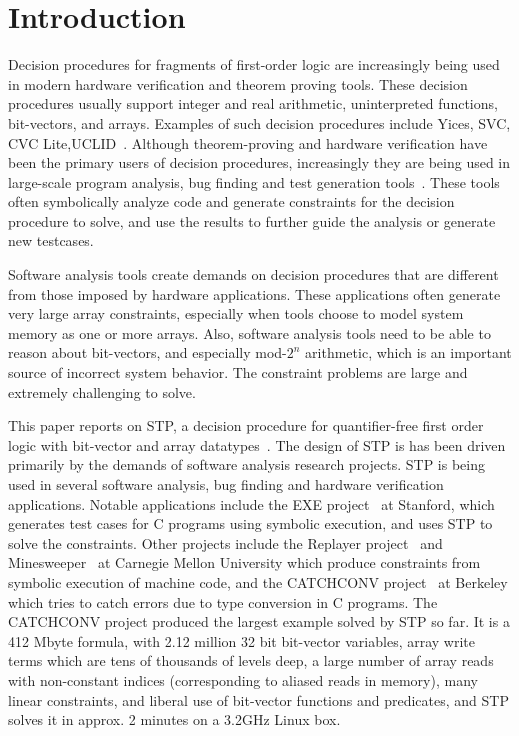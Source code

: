 \section{Introduction}

Decision procedures for fragments of first-order logic are
increasingly being used in modern hardware verification and theorem
proving tools. These decision procedures usually support integer and
real arithmetic, uninterpreted functions, bit-vectors, and
arrays. Examples of such decision procedures include Yices, SVC, CVC
Lite,UCLID~\cite{yices,svc,cvcl,uclid}. Although theorem-proving and
hardware verification have been the primary users of decision
procedures, increasingly they are being used in large-scale program
analysis, bug finding and test generation
tools~\cite{exe-ccs06,replayer06}. These tools often symbolically
analyze code and generate constraints for the decision procedure to
solve, and use the results to further guide the analysis or generate
new testcases.

Software analysis tools create demands on decision procedures that are
different from those imposed by hardware applications. These
applications often generate very large array constraints, especially
when tools choose to model system memory as one or more arrays.  Also,
software analysis tools need to be able to reason about bit-vectors,
and especially mod-$2^n$ arithmetic, which is an important source of
incorrect system behavior.  The constraint problems are large and
extremely challenging to solve.

This paper reports on STP, a decision procedure for quantifier-free
first order logic with bit-vector and array
datatypes~\cite{stumparray}.  The design of STP is has been driven
primarily by the demands of software analysis research projects. STP
is being used in several software analysis, bug finding and hardware
verification applications. Notable applications include the EXE
project~\cite{exe-ccs06} at Stanford, which generates test cases for C
programs using symbolic execution, and uses STP to solve the
constraints. Other projects include the Replayer
project~\cite{replayer06} and Minesweeper~\cite{minesweeper2007} at
Carnegie Mellon University which produce constraints from symbolic
execution of machine code, and the CATCHCONV
project~\cite{catchconv07} at Berkeley which tries to catch errors due
to type conversion in C programs. The CATCHCONV project produced the
largest example solved by STP so far. It is a 412 Mbyte formula, with
2.12 million 32 bit bit-vector variables, array write terms which are
tens of thousands of levels deep, a large number of array reads with
non-constant indices (corresponding to aliased reads in memory), many
linear constraints, and liberal use of bit-vector functions and
predicates, and STP solves it in approx. 2 minutes on a 3.2GHz Linux
box.

